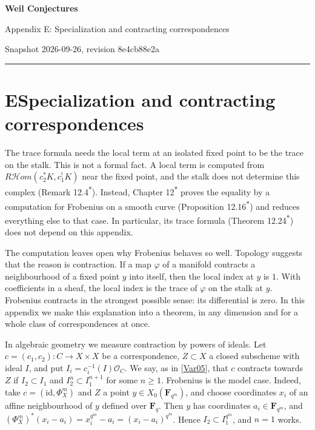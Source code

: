 \documentclass[11pt]{article}
\newcommand{\bpout}[1]{#1\textsuperscript{\hyperlink{bp-outside}{\ensuremath{\ast}}}}
\providecommand{\cHom}{}\renewcommand{\cHom}{R\mathcal{H}\!om}
\begin{document}
\pagestyle{plain}
\begin{center}
{\LARGE\bfseries Weil Conjectures\par}
\vspace{0.7em}
{\large Appendix E: Specialization and contracting correspondences\par}
\vspace{0.5em}
{\small\color{bpmuted}Snapshot 2026-09-26, revision 8e4cb88e2a\par}
\end{center}
\vspace{0.5em}
{\small\tableofcontents}
\bigskip\hrule\bigskip

\section*{\texorpdfstring{E\quad Specialization and contracting correspondences}{E Specialization and contracting correspondences}}
\label{bp1}%
\label{bp2}%
The trace formula needs the local term at an isolated fixed point to be the trace on the stalk. This is not a formal fact. A local term is computed from \(\cHom(c_2^*K,c_1^!K)\) near the fixed point, and the stalk does not determine this complex (Remark \bpout{12.4}). Instead, Chapter \bpout{12} proves the equality by a computation for Frobenius on a smooth curve (Proposition \bpout{12.16}) and reduces everything else to that case. In particular, its trace formula (Theorem \bpout{12.24}) does not depend on this appendix.

The computation leaves open why Frobenius behaves so well. Topology suggests that the reason is contraction. If a map \(\varphi\) of a manifold contracts a neighbourhood of a fixed point \(y\) into itself, then the local index at \(y\) is \(1\). With coefficients in a sheaf, the local index is the trace of \(\varphi\) on the stalk at \(y\). Frobenius contracts in the strongest possible sense: its differential is zero. In this appendix we make this explanation into a theorem, in any dimension and for a whole class of correspondences at once.

In algebraic geometry we measure contraction by powers of ideals. Let \(c=(c_1,c_2):C\to X\times X\) be a correspondence, \(Z\subset X\) a closed subscheme with ideal \(I\), and put \(I_i=c_i^{-1}(I)\mathcal O_C\). We say, as in [\hyperref[bp98]{Var05}], that \(c\) contracts towards \(Z\) if \(I_2\subset I_1\) and \(I_2^n\subset I_1^{n+1}\) for some \(n\geq1\). Frobenius is the model case. Indeed, take \(c=(\mathrm{id},\Phi_X^m)\) and \(Z\) a point \(y\in X_0(\mathbf F_{q^m})\), and choose coordinates \(x_i\) of an affine neighbourhood of \(y\) defined over \(\mathbf F_q\). Then \(y\) has coordinates \(a_i\in\mathbf F_{q^m}\), and \((\Phi_X^m)^*(x_i-a_i)=x_i^{q^m}-a_i=(x_i-a_i)^{q^m}\). Hence \(I_2\subset I_1^{q^m}\), and \(n=1\) works.
\end{document}
